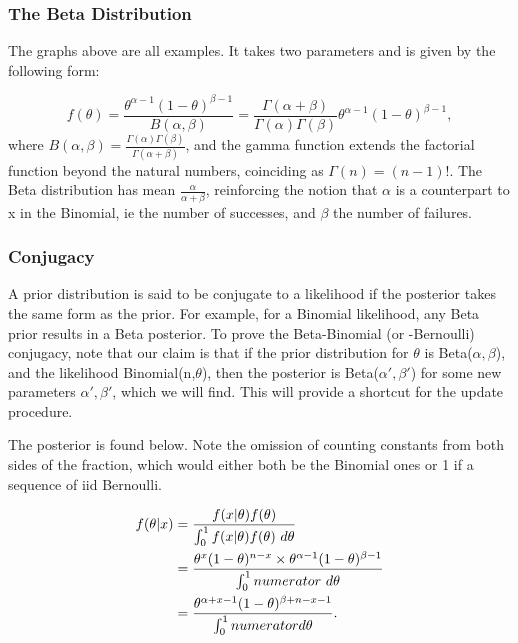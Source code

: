 \documentclass{article}
\begin{document}
\subsubsection{The Beta Distribution}
The graphs above are all examples. It takes two parameters and is given by the following form:

\begin{equation}
    f(\theta)=\frac{\theta^ {\alpha-1} (1-\theta)^ {\beta-1}}{B(\alpha,\beta)}
    =\frac{\Gamma(\alpha+\beta)}{\Gamma(\alpha)\Gamma(\beta)}\theta^ {\alpha-1} (1-\theta)^ {\beta-1},
\end{equation}
where $B(\alpha,\beta)=\frac{\Gamma(\alpha)\Gamma(\beta)}{\Gamma(\alpha+\beta)}$, and the gamma function extends the factorial function beyond the natural numbers, coinciding as $\Gamma(n)=(n-1)!$. The Beta distribution has mean $\frac{\alpha}{\alpha+\beta}$, reinforcing the notion that $\alpha$ is a counterpart to x in the Binomial, ie the number of successes, and $\beta$ the number of failures. 


\subsubsection{Conjugacy}
A prior distribution is said to be conjugate to a likelihood if the posterior takes the same form as the prior. For example, for a Binomial likelihood, any Beta prior results in a Beta posterior. To prove the Beta-Binomial (or -Bernoulli) conjugacy, note that our claim is that if the prior distribution for $\theta$ is Beta($\alpha,\beta$), and the likelihood Binomial(n,$\theta$), then the posterior is Beta($\alpha',\beta'$) for some new parameters $\alpha',\beta'$, which we will find. This will provide a shortcut for the update procedure.

The posterior is found below. Note the omission of counting constants from both sides of the fraction, which would either both be the Binomial ones or 1 if a sequence of iid Bernoulli.

\begin{equation}
\begin{split}
f(\theta|x)
&= \frac{f(x|\theta)f(\theta)}{\int_0^1 f(x|\theta)f(\theta)\ d\theta} \\
&= \frac{\theta^x (1-\theta)^{n-x} \times \theta^{\alpha-1} (1-\theta)^{\beta-1}}{\int_0^1 numerator \space \ d\theta} \\
&= \frac{\theta^{\alpha+x-1} (1-\theta)^{\beta+n-x-1}}{\int_0^1 {numerator} d\theta}. \\
\end{split}
\end{equation}
\end{document}

